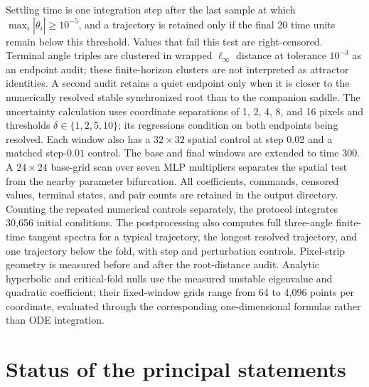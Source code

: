 \documentclass[11pt,a4paper]{article}
\theoremstyle{definition}
\begin{document}
Settling time is one integration step after the last sample at which
$\max_i|\dot\theta_i|\geq10^{-5}$, and a trajectory is retained only if the final
20 time units remain below this threshold.  Values that fail this test are
right-censored.  Terminal angle triples are clustered in wrapped $\ell_\infty$
distance at tolerance $10^{-3}$ as an endpoint audit; these finite-horizon clusters
are not interpreted as attractor identities.  A second audit retains a quiet endpoint
only when it is closer to the numerically resolved stable synchronized root than to
the companion saddle.  The uncertainty calculation uses coordinate
separations of 1, 2, 4, 8, and 16 pixels and thresholds
$\delta\in\{1,2,5,10\}$; its regressions condition on both endpoints being resolved.
Each window also has a $32\times32$ spatial control at step $0.02$ and a matched
step-$0.01$ control.  The base and final windows are extended to time 300.  A
$24\times24$ base-grid scan over seven MLP multipliers separates the spatial test
from the nearby parameter bifurcation.  All coefficients, commands, censored values,
terminal states, and pair counts are retained in the output directory.  Counting
the repeated numerical controls separately, the protocol integrates 30,656 initial
conditions.  The postprocessing also computes full three-angle finite-time tangent
spectra for a typical trajectory, the longest resolved trajectory, and one trajectory
below the fold, with step and perturbation controls.  Pixel-strip geometry is measured
before and after the root-distance audit.  Analytic hyperbolic and critical-fold
nulls use the measured unstable eigenvalue and quadratic coefficient; their
fixed-window grids range from 64 to 4,096 points per coordinate, evaluated through
the corresponding one-dimensional formulas rather than ODE integration.

\section{Status of the principal statements}
\end{document}
